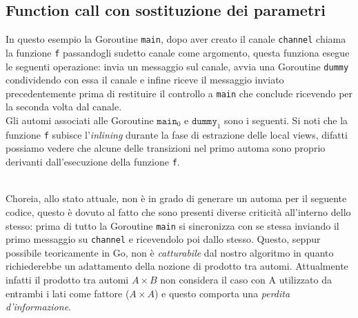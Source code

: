 \subsection{Function call con sostituzione dei parametri}
In questo esempio la Goroutine \texttt{main}, dopo aver creato il canale \texttt{channel} chiama la funzione \texttt{f} passandogli sudetto canale come argomento, questa funziona esegue le seguenti operazione: invia un messaggio sul canale, avvia una Goroutine \texttt{dummy} condividendo con essa il canale e infine riceve il messaggio inviato precedentemente prima di restituire il controllo a \texttt{main} che conclude ricevendo per la seconda volta dal canale. \bigskip \\

Gli automi associati alle Goroutine $\texttt{main}_0$ e $\texttt{dummy}_1$ sono i seguenti. Si noti che la funzione \texttt{f} subisce l'\emph{inlining} durante la fase di estrazione delle local views, difatti possiamo vedere che alcune delle transizioni nel primo automa sono proprio derivanti dall'esecuzione della funzione \texttt{f}.
\begin{figure}[h!]
\end{figure}\\
Choreia, allo stato attuale, non è in grado di generare un automa per il seguente codice, questo è dovuto al fatto che sono presenti diverse criticità all'interno dello stesso: prima di tutto la Goroutine \texttt{main} si sincronizza con se stessa inviando il primo messaggio su \texttt{channel} e ricevendolo poi dallo stesso. Questo, seppur possibile teoricamente in Go, non è \emph{catturabile} dal nostro algoritmo in quanto richiederebbe un adattamento della nozione di prodotto tra automi. Attualmente infatti il prodotto tra automi $A \times B$ non considera il caso con A utilizzato da entrambi i lati come fattore ($A \times A$) e questo comporta una \emph{perdita d'informazione}.\\
